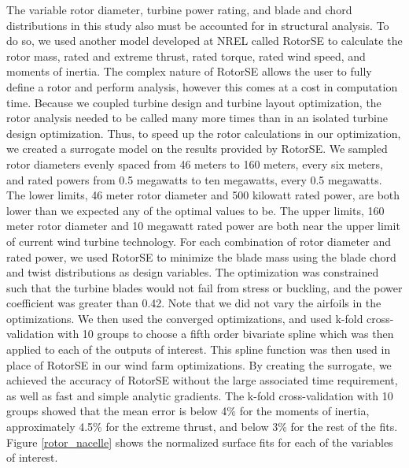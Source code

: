 \label{rotor_nacelle}

The variable rotor diameter, turbine power rating, and blade and chord distributions in this study also must be accounted for in structural analysis.  To do so, we used another model developed at NREL called RotorSE \citep{ning2013rotorse} to calculate the rotor mass, rated and extreme thrust, rated torque, rated wind speed, and moments of inertia. The complex nature of RotorSE allows the user to fully define a rotor and perform analysis, however this comes at a cost in computation time. Because we coupled turbine design and turbine layout optimization, the rotor analysis needed to be called many more times than in an isolated turbine design optimization. 
Thus, to speed up the rotor calculations in our optimization, we created a surrogate model on the results provided by RotorSE. We sampled rotor diameters evenly spaced from 46 meters to 160 meters, every six meters, and rated powers from 0.5 megawatts to ten megawatts, every 0.5 megawatts. The lower limits, 46 meter rotor diameter and 500 kilowatt rated power, are both lower than we expected any of the optimal values to be. The upper limits, 160 meter rotor diameter and 10 megawatt rated power are both near the upper limit of current wind turbine technology. For each combination of rotor diameter and rated power, we used RotorSE to minimize the blade mass using the blade chord and twist distributions as design variables. The optimization was constrained such that the turbine blades would not fail from stress or buckling, and the power coefficient was greater than 0.42. Note that we did not vary the airfoils in the optimizations. 
%
We then used the converged optimizations, and used k-fold cross-validation with 10 groups to choose a fifth order bivariate spline which was then applied to each of the outputs of interest. This spline function was then used in place of RotorSE in our wind farm optimizations. By creating the surrogate, we achieved the accuracy of RotorSE without the large associated time requirement, as well as fast and simple analytic gradients. 
The k-fold cross-validation with 10 groups showed that the mean error is below 4\% for the moments of inertia, approximately 4.5\% for the extreme thrust, and below 3\% for the rest of the fits. 
Figure \ref{rotor_nacelle} shows the normalized surface fits for each of the variables of interest.


